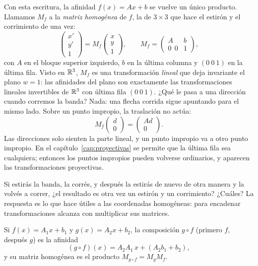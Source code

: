 Con esta escritura, la afinidad \(f(x)=Ax+b\) se vuelve un único producto. Llamamos \(M_f\) a
la \emph{matriz homogénea} de \(f\), la de \(3\times3\) que hace el estirón y el corrimiento de
una vez:
\[
\begin{pmatrix}x'\\y'\\1\end{pmatrix}
=M_f\begin{pmatrix}x\\y\\1\end{pmatrix},
\qquad
M_f=\begin{pmatrix}A&b\\0\ \ 0&1\end{pmatrix},
\]
con \(A\) en el bloque superior izquierdo, \(b\) en la última columna y \((0\ 0\ 1)\) en la
última fila. Visto en \(\mathbb{R}^3\), \(M_f\) es una transformación \emph{lineal} que deja
invariante el plano \(w=1\): las afinidades del plano son exactamente las transformaciones
lineales invertibles de \(\mathbb{R}^3\) con última fila \((0\ 0\ 1)\). ¿Qué le pasa a una dirección
cuando corremos la banda? Nada: una flecha corrida sigue apuntando para el mismo lado. Sobre un
punto impropio, la traslación no actúa:
\[
  M_f\begin{pmatrix}d\\0\end{pmatrix}=\begin{pmatrix}Ad\\0\end{pmatrix}.
\]
Las direcciones solo sienten la parte lineal, y un punto impropio va a otro punto impropio.
En el capítulo~\ref{cap:proyectivas} se permite que la última fila sea cualquiera; entonces los
puntos impropios pueden volverse ordinarios, y aparecen las transformaciones proyectivas.

Si estirás la banda, la corrés, y después la estirás de nuevo de otra manera y la volvés a
correr, ¿el resultado es otra vez un estirón y un corrimiento? ¿Cuáles? La respuesta es lo que
hace útiles a las coordenadas homogéneas: para encadenar transformaciones alcanza con
multiplicar sus matrices.

\begin{proposicion}\label{prop:06-composicion}
Si \(f(x)=A_1x+b_1\) y \(g(x)=A_2x+b_2\), la composición \(g\circ f\) (primero \(f\), después
\(g\)) es la afinidad
\[
  (g\circ f)(x)=A_2A_1\,x+(A_2b_1+b_2),
\]
y su matriz homogénea es el producto \(M_{g\circ f}=M_gM_f\).
\end{proposicion}

